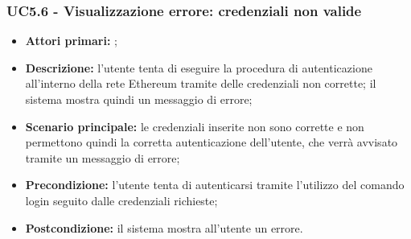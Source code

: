 \subsubsection{UC5.6 - Visualizzazione errore: credenziali non valide }
\begin{itemize}
	\item \textbf{Attori primari:} \una{};
	\item \textbf{Descrizione:} l’utente tenta di eseguire la procedura di autenticazione all’interno della rete Ethereum tramite delle credenziali non corrette; il sistema mostra quindi un messaggio di errore;
	\item \textbf{Scenario principale:} le credenziali inserite non sono corrette e non permettono quindi la corretta autenticazione dell’utente, che verrà avvisato tramite un messaggio di errore;
	\item \textbf{Precondizione:} l’utente tenta di autenticarsi tramite l’utilizzo del comando login seguito dalle credenziali richieste;
	\item \textbf{Postcondizione:} il sistema mostra all’utente un errore. 
\end{itemize}
